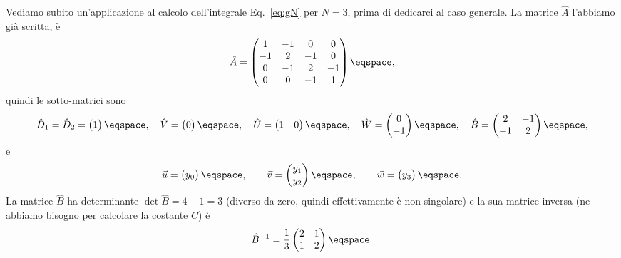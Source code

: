 Vediamo subito un'applicazione al calcolo dell'integrale Eq.~\eqref{eq:gN} per
$N=3$, prima di dedicarci al caso generale.
La matrice $\hat{A}$ l'abbiamo gi\`a scritta, \`e 
\begin{displaymath}
\hat{A}  =  \begin{pmatrix} 1 & -1 & 0  & 0 \\ -1 & 2 & -1 & 0 \\ 
0 & -1 & 2 & -1  \\ 0 & 0 & -1 & 1 
\end{pmatrix}
\eqspace ,
\end{displaymath}
quindi le sotto-matrici sono
\begin{displaymath}
\hat{D}_{1} = \hat{D}_{2} = \begin{pmatrix} 1 \end{pmatrix} \eqspace, \quad 
\hat{V} =\begin{pmatrix} 0 \end{pmatrix} \eqspace, \quad 
\hat{U} = \begin{pmatrix} 1 & 0 \end{pmatrix} 
\eqspace, \quad 
\hat{W} = \begin{pmatrix} 0 \\ -1 \end{pmatrix} \eqspace ,\quad 
\hat{B} = \begin{pmatrix} 2 & -1 \\ -1 & 2 \end{pmatrix} \eqspace ,
\end{displaymath}
e 
\begin{displaymath}
\vec{u} = \begin{pmatrix} y_{0} \end{pmatrix} \eqspace ,\qquad
\vec{v} = \begin{pmatrix} y_{1} \\ y_{2} \end{pmatrix} \eqspace, \qquad 
\vec{w} = \begin{pmatrix} y_{3} \end{pmatrix} \eqspace .
\end{displaymath}
La matrice $\hat{B}$ ha determinante $\det \hat{B} = 4 -1 = 3$ (diverso da zero,
quindi effettivamente \`e non singolare) e la sua matrice inversa (ne abbiamo
bisogno per calcolare la costante $C$) \`e 
\begin{displaymath}
\hat{B}^{-1} = \frac{1}{3} \begin{pmatrix}  2 & 1 \\ 1 & 2 \end{pmatrix}
\eqspace.
\end{displaymath}
